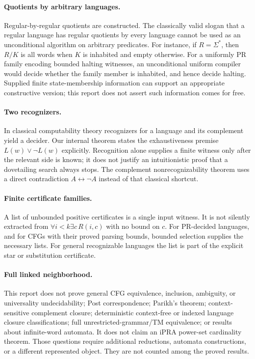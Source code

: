 \paragraph{Quotients by arbitrary languages.}
Regular-by-regular quotients are constructed. The classically valid slogan
that a regular language has regular quotients by every language cannot be
used as an unconditional algorithm on arbitrary predicates. For instance,
if $R=\Sigma^*$, then $R/K$ is all words when $K$ is inhabited and empty
otherwise. For a uniformly PR family encoding bounded halting witnesses,
an unconditional uniform compiler would decide whether the family member
is inhabited, and hence decide halting. Supplied finite state-membership
information can support an appropriate constructive version; this report
does not assert such information comes for free.

\paragraph{Two recognizers.}
In classical computability theory recognizers for a language and its
complement yield a decider. Our internal theorem states the exhaustiveness
premise $L(w)\lor\neg L(w)$ explicitly. Recognition alone supplies a
finite witness only after the relevant side is known; it does not justify
an intuitionistic proof that a dovetailing search always stops. The
complement nonrecognizability theorem uses a direct contradiction
$A\leftrightarrow\neg A$ instead of that classical shortcut.

\paragraph{Finite certificate families.}
A list of unbounded positive certificates is a single input witness.
It is not silently extracted from
$\forall i<k\exists c\,R(i,c)$ with no bound on $c$.
For PR-decided languages, and for CFGs with their proved parsing bounds,
bounded selection supplies the necessary lists. For general recognizable
languages the list is part of the explicit star or substitution certificate.

\paragraph{Full linked neighborhood.}
This report does not prove general CFG equivalence, inclusion, ambiguity,
or universality undecidability; Post correspondence; Parikh's theorem;
context-sensitive complement closure; deterministic context-free or indexed
language closure classifications; full unrestricted-grammar/TM equivalence;
or results about infinite-word automata. It does not claim an iPRA
power-set cardinality theorem. Those questions require additional
reductions, automata constructions, or a different represented object.
They are not counted among the proved results.

